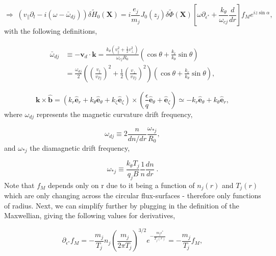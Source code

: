 \documentclass[12pt]{article}
\numberwithin{equation}{subsection}
\begin{document}
   \begin{equation}
      \Rightarrow\; (v_\parallel\partial_l - i(\omega - \bar{\omega}_{dj}))\delta\widetilde{H}_0(\bm{X}) =
      i\frac{e_j}{m_j}J_0(z_j)\delta\widetilde{\Phi}(\bm{X})[\omega\partial_{\epsilon^*} + \frac{k_\theta}{\omega_{cj}}\frac{d}{dr}]f_M
      e^{iz\sin\alpha},
   \end{equation}
with the following definitions,

   \begin{equation}
   \begin{aligned}
      \bar{\omega}_{dj} &\equiv -\bm{v}_d\cdot\bm{k} = \frac{k_\theta(v_\parallel^2 + \frac{1}{2}v_\perp^2)}{\omega_{cj}R_0}(\cos\theta
                                + \frac{k_r}{k_\theta}\sin\theta) \\
                        &= \frac{\omega_{dj}}{2}(\left(\frac{v_\parallel}{v_{Tj}}\right)^2 + \frac{1}{2}\left(\frac{v_\perp}{v_{Tj}}\right)^2)
                           (\cos\theta + \frac{k_r}{k_\theta}\sin\theta),  
   \end{aligned}
   \end{equation}

   \begin{equation}
      \bm{k}\times\bm{\hat{b}} = (k_r\bm{\hat{e}}_r + k_\theta\bm{\hat{e}}_\theta + k_\zeta\bm{\hat{e}}_\zeta)\times
      (\frac{\epsilon}{q}\bm{\hat{e}}_\theta + \bm{\hat{e}}_\zeta) \simeq -k_r\bm{\hat{e}}_\theta + k_\theta\bm{\hat{e}}_r,
   \end{equation}
where $\omega_{dj}$ represents the magnetic curvature drift frequency,
   
   \begin{equation}
      \omega_{dj} \equiv 2\frac{n}{dn/dr}\frac{\omega_{*j}}{R_0},
   \end{equation}
and $\omega_{*j}$ the diamagnetic drift frequency,

   \begin{equation}
      \omega_{*j} \equiv \frac{k_\theta T_j}{q_j B}\frac{1}{n}\frac{dn}{dr}\;.
   \end{equation}
Note that $f_M$ depends only on r due to it being a function of $n_j(r)$ and $T_j(r)$ which are only changing across the circular
flux-surfaces - therefore only functions of radius. Next, we can simplify further by plugging in the definition of the Maxwellian,
giving the following values for derivatives,

   \begin{equation}
      \partial_{\epsilon^*}f_M = -\frac{m_j}{T_j}n_j\left(\frac{m_j}{2\pi T_j}\right)^{3/2}e^{-\frac{m_j \epsilon^*}{T_j(r)}} =
                                 -\frac{m_j}{T_j}f_M,
   \end{equation}
   
\end{document}
